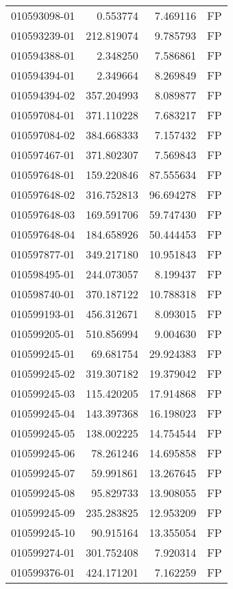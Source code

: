 \begin{tabular}{lrrl}
010593098-01 &    0.553774 &     7.469116 &   FP \\
010593239-01 &  212.819074 &     9.785793 &   FP \\
010594388-01 &    2.348250 &     7.586861 &   FP \\
010594394-01 &    2.349664 &     8.269849 &   FP \\
010594394-02 &  357.204993 &     8.089877 &   FP \\
010597084-01 &  371.110228 &     7.683217 &   FP \\
010597084-02 &  384.668333 &     7.157432 &   FP \\
010597467-01 &  371.802307 &     7.569843 &   FP \\
010597648-01 &  159.220846 &    87.555634 &   FP \\
010597648-02 &  316.752813 &    96.694278 &   FP \\
010597648-03 &  169.591706 &    59.747430 &   FP \\
010597648-04 &  184.658926 &    50.444453 &   FP \\
010597877-01 &  349.217180 &    10.951843 &   FP \\
010598495-01 &  244.073057 &     8.199437 &   FP \\
010598740-01 &  370.187122 &    10.788318 &   FP \\
010599193-01 &  456.312671 &     8.093015 &   FP \\
010599205-01 &  510.856994 &     9.004630 &   FP \\
010599245-01 &   69.681754 &    29.924383 &   FP \\
010599245-02 &  319.307182 &    19.379042 &   FP \\
010599245-03 &  115.420205 &    17.914868 &   FP \\
010599245-04 &  143.397368 &    16.198023 &   FP \\
010599245-05 &  138.002225 &    14.754544 &   FP \\
010599245-06 &   78.261246 &    14.695858 &   FP \\
010599245-07 &   59.991861 &    13.267645 &   FP \\
010599245-08 &   95.829733 &    13.908055 &   FP \\
010599245-09 &  235.283825 &    12.953209 &   FP \\
010599245-10 &   90.915164 &    13.355054 &   FP \\
010599274-01 &  301.752408 &     7.920314 &   FP \\
010599376-01 &  424.171201 &     7.162259 &   FP \\

\end{tabular}
